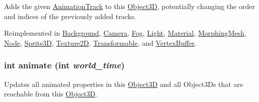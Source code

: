 Adds the given \hyperlink{classm3g_1_1AnimationTrack}{AnimationTrack} to this \hyperlink{classm3g_1_1Object3D}{Object3D}, potentially changing the order and indices of the previously added tracks. 

Reimplemented in \hyperlink{classm3g_1_1Background_415c0b110f95410ded9b85e5d99a496b}{Background}, \hyperlink{classm3g_1_1Camera_415c0b110f95410ded9b85e5d99a496b}{Camera}, \hyperlink{classm3g_1_1Fog_415c0b110f95410ded9b85e5d99a496b}{Fog}, \hyperlink{classm3g_1_1Light_415c0b110f95410ded9b85e5d99a496b}{Light}, \hyperlink{classm3g_1_1Material_415c0b110f95410ded9b85e5d99a496b}{Material}, \hyperlink{classm3g_1_1MorphingMesh_415c0b110f95410ded9b85e5d99a496b}{MorphingMesh}, \hyperlink{classm3g_1_1Node_415c0b110f95410ded9b85e5d99a496b}{Node}, \hyperlink{classm3g_1_1Sprite3D_415c0b110f95410ded9b85e5d99a496b}{Sprite3D}, \hyperlink{classm3g_1_1Texture2D_415c0b110f95410ded9b85e5d99a496b}{Texture2D}, \hyperlink{classm3g_1_1Transformable_415c0b110f95410ded9b85e5d99a496b}{Transformable}, and \hyperlink{classm3g_1_1VertexBuffer_415c0b110f95410ded9b85e5d99a496b}{VertexBuffer}.\hypertarget{classm3g_1_1Object3D_8aad1ceab4c2a03609c8a42324ce484d}{
\subsubsection[{animate}]{\setlength{\rightskip}{0pt plus 5cm}int animate (int {\em world\_\-time})}}
\label{classm3g_1_1Object3D_8aad1ceab4c2a03609c8a42324ce484d}


Updates all animated properties in this \hyperlink{classm3g_1_1Object3D}{Object3D} and all Object3Ds that are reachable from this \hyperlink{classm3g_1_1Object3D}{Object3D}. 

